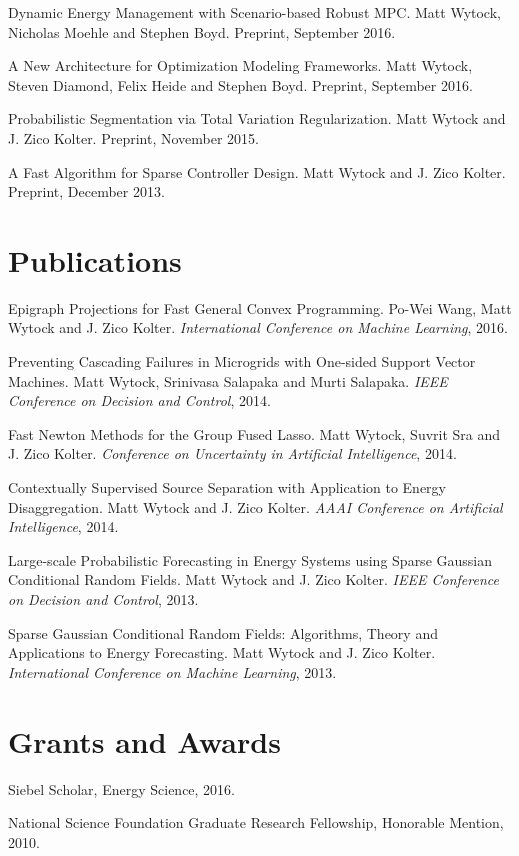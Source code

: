 \documentclass[margin, line]{res}
\begin{document}
\begin{resume}
Dynamic Energy Management with Scenario-based Robust MPC. Matt Wytock, Nicholas Moehle and
Stephen Boyd. Preprint, September 2016.

A New Architecture for Optimization Modeling Frameworks. Matt Wytock, Steven
Diamond, Felix Heide and Stephen Boyd. Preprint, September 2016.

Probabilistic Segmentation via Total Variation Regularization. Matt Wytock and
J. Zico Kolter. Preprint, November 2015.

A Fast Algorithm for Sparse Controller Design. Matt Wytock and J. Zico
Kolter. Preprint, December 2013.

\section{Publications}

Epigraph Projections for Fast General Convex Programming. Po-Wei Wang, Matt
Wytock and J. Zico Kolter. \emph{International Conference on Machine Learning},
2016.

Preventing Cascading Failures in Microgrids with One-sided Support Vector
Machines. Matt Wytock, Srinivasa Salapaka and Murti Salapaka. \emph{IEEE
Conference on Decision and Control}, 2014.

Fast Newton Methods for the Group Fused Lasso. Matt Wytock, Suvrit Sra and
J. Zico Kolter. \emph{Conference on Uncertainty in Artificial Intelligence}, 2014.

Contextually Supervised Source Separation with Application to Energy
Disaggregation. Matt Wytock and J. Zico Kolter. \emph{AAAI Conference on Artificial
Intelligence}, 2014.

Large-scale Probabilistic Forecasting in Energy Systems using Sparse Gaussian
Conditional Random Fields. Matt Wytock and J. Zico Kolter. \emph{IEEE Conference
on Decision and Control}, 2013.

Sparse Gaussian Conditional Random Fields: Algorithms, Theory and Applications
to Energy Forecasting. Matt Wytock and J. Zico Kolter. \emph{International Conference
on Machine Learning}, 2013.

\section{Grants and Awards}

Siebel Scholar, Energy Science, 2016.

National Science Foundation Graduate Research Fellowship, Honorable Mention,
2010.


\end{resume}
\end{document}
